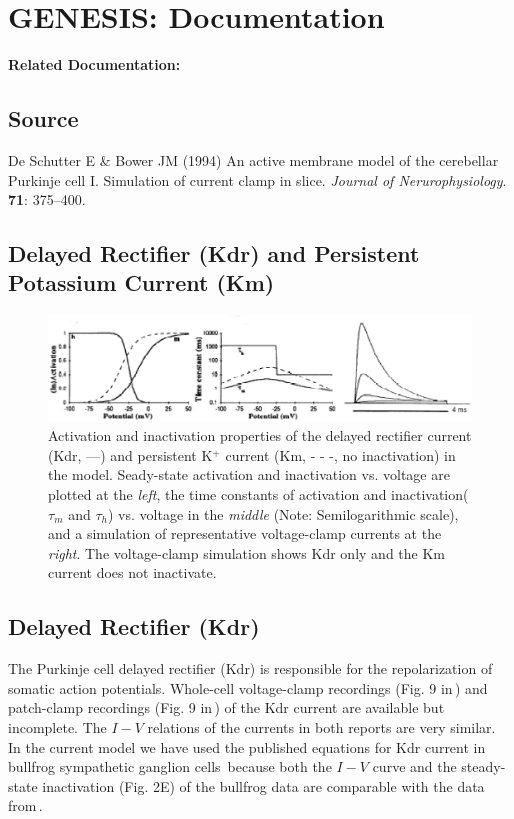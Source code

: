 \documentclass[12pt]{article}
\begin{document}
\section*{GENESIS: Documentation}

{\bf Related Documentation:}

\subsection*{Source}

De Schutter E \& Bower JM (1994) An active membrane model of the cerebellar Purkinje cell I. Simulation of current clamp in slice. {\it Journal of Nerurophysiology}. {\bf 71}: 375--400. \\

\subsection*{Delayed Rectifier (Kdr) and Persistent Potassium Current (Km)}

\begin{figure}[h]
\centering
   \includegraphics[scale=0.75]{figures/DS1.2E.eps}
   \caption{Activation and inactivation properties of the delayed rectifier current (Kdr, ---) and persistent K$^+$ current (Km, - - -, no inactivation) in the model. Seady-state activation and inactivation vs. voltage are plotted at the {\em left}, the time constants of activation and inactivation($\tau_m$ and $\tau_h$) vs. voltage in the {\em middle} (Note: Semilogarithmic scale), and a simulation of representative voltage-clamp currents at the {\em right}. The voltage-clamp simulation shows Kdr only and the Km current does not inactivate.}
   \label{fig:DS1.2E}
\end{figure}

\subsection*{Delayed Rectifier (Kdr)}

The Purkinje cell delayed rectifier (Kdr) is responsible for the repolarization of somatic action potentials. Whole-cell voltage-clamp recordings (Fig. 9 in\,\cite{Hirano:1989uq}) and patch-clamp recordings (Fig. 9 in\,\cite{Gahwiler:1989fk}) of the Kdr current are available but incomplete. The $I-V$ relations of the currents in both reports are very similar. In the current model we have used the published equations for Kdr current in bullfrog sympathetic ganglion cells\,\cite{Yamada-W:1989bs} because both the $I-V$ curve and the steady-state inactivation (Fig. 2E) of the bullfrog data are comparable with the data from\,\cite{Hirano:1989uq}.
\end{document}
